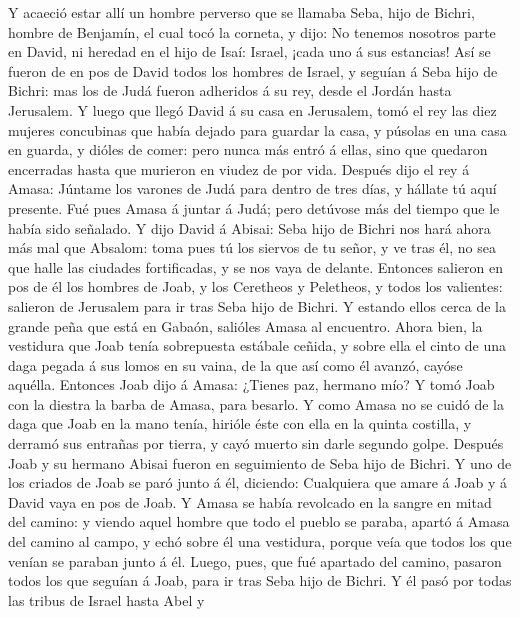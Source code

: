  Y acaeció estar allí un hombre perverso que se llamaba
Seba, hijo de Bichri, hombre de Benjamín, el cual tocó la corneta, y
dijo: No tenemos nosotros parte en David, ni heredad en el hijo de Isaí:
Israel, ¡cada uno á sus estancias!  Así se fueron de en pos
de David todos los hombres de Israel, y seguían á Seba hijo de Bichri:
mas los de Judá fueron adheridos á su rey, desde el Jordán hasta
Jerusalem.  Y luego que llegó David á su casa en Jerusalem,
tomó el rey las diez mujeres concubinas que había dejado para guardar la
casa, y púsolas en una casa en guarda, y dióles de comer: pero nunca más
entró á ellas, sino que quedaron encerradas hasta que murieron en viudez
de por vida.  Después dijo el rey á Amasa: Júntame los
varones de Judá para dentro de tres días, y hállate tú aquí presente.
 Fué pues Amasa á juntar á Judá; pero detúvose más del
tiempo que le había sido señalado.  Y dijo David á Abisai:
Seba hijo de Bichri nos hará ahora más mal que Absalom: toma pues tú los
siervos de tu señor, y ve tras él, no sea que halle las ciudades
fortificadas, y se nos vaya de delante.  Entonces salieron
en pos de él los hombres de Joab, y los Ceretheos y Peletheos, y todos
los valientes: salieron de Jerusalem para ir tras Seba hijo de Bichri.
 Y estando ellos cerca de la grande peña que está en Gabaón,
salióles Amasa al encuentro. Ahora bien, la vestidura que Joab tenía
sobrepuesta estábale ceñida, y sobre ella el cinto de una daga pegada á
sus lomos en su vaina, de la que así como él avanzó, cayóse aquélla.
 Entonces Joab dijo á Amasa: ¿Tienes paz, hermano mío? Y
tomó Joab con la diestra la barba de Amasa, para besarlo. 
Y como Amasa no se cuidó de la daga que Joab en la mano tenía, hirióle
éste con ella en la quinta costilla, y derramó sus entrañas por tierra,
y cayó muerto sin darle segundo golpe. Después Joab y su hermano Abisai
fueron en seguimiento de Seba hijo de Bichri.  Y uno de los
criados de Joab se paró junto á él, diciendo: Cualquiera que amare á
Joab y á David vaya en pos de Joab.  Y Amasa se había
revolcado en la sangre en mitad del camino: y viendo aquel hombre que
todo el pueblo se paraba, apartó á Amasa del camino al campo, y echó
sobre él una vestidura, porque veía que todos los que venían se paraban
junto á él.  Luego, pues, que fué apartado del camino,
pasaron todos los que seguían á Joab, para ir tras Seba hijo de Bichri.
 Y él pasó por todas las tribus de Israel hasta Abel y
